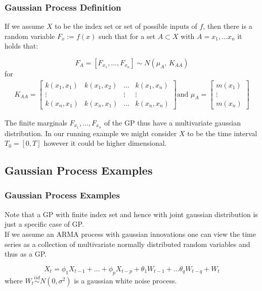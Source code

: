 \documentclass[
	9pt, %
]{beamer}
\begin{document}
\begin{frame}
	\frametitle{Gaussian Process Definition}


If we assume $X$ to be the index set or set of possible inputs of $f$, then there is a random variable
$F_x := f(x)$ such that for a set $A \subset X$ with $A={x_1, \dots x_n}$ it holds that:

\[F_A = [F_{x_1}, \dots , F_{x_n}] \sim N(\mu_A,\,K_{AA})\]
for
\begin{gather}\label{def:Kernel-Matrix}
    K_{AA} =
    \begin{bmatrix}
        k(x_1, x_1) & k(x_1, x_2) & \dots & k(x_1, x_n)\\
        \vdots  &  & \vdots  & \vdots \\
        k(x_n, x_1)  & k(x_n, x_1) & \dots  & k(x_n, x_n)
    \end{bmatrix} \text{and }
    \mu_A =
    \begin{bmatrix}
        m(x_1) \\
        \vdots \\
        m(x_n)
    \end{bmatrix}
\end{gather}

The finite marginals $F_{x_1}, \dots, F_{x_n}$ of the GP thus have a multivariate gaussian distribution.
In our running example we might consider $X$ to be the time interval $T_0=[0, T]$ however it could be higher dimensional.

\end{frame}

\subsection{Gaussian Process Examples}

\begin{frame}
	\frametitle{Gaussian Process Examples}
	Note that a GP with finite index set and hence with joint gaussian distribution is just a specific case
of GP. \\

	If we assume an ARMA process with gaussian innovations one can view the time series
as a collection of multivariate normally distributed random variables and thus as a GP.

	\[
        X_t =  \phi_1 X_{t-1} + \dots + \phi_p X_{t-p} + \theta_1 W_{t-1} + \dots \theta_q W_{t-q} + W_t
    \]
    where $W_t \stackrel{iid}{\sim} N(0, \sigma^2)$ is a gaussian white noise process.


\end{frame}
\end{document}
